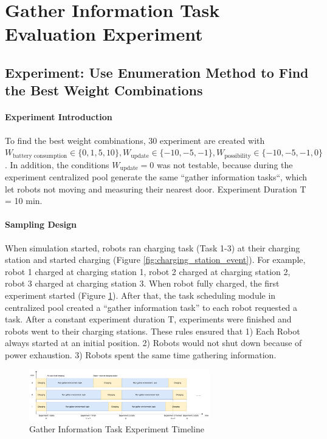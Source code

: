 \section{Gather Information Task Evaluation Experiment}
\label{sec:gather_info_task_experiments}

\subsection{Experiment: Use Enumeration Method to Find the Best Weight Combinations}
\label{sec:gather_info_experiment_enumerate}
\paragraph{Experiment Introduction} 
To find the best weight combinations, 30 experiment are created with $W_{\mbox{battery consumption}} \in \{ 0,1,5,10 \},  W_{\mbox{update}} \in \{-10,-5,-1\}, W_{\mbox{possibility}} \in \{-10,-5,-1,0\}$. In addition, the conditions $W_{\mbox{update}}=0$ was not testable, because during the experiment centralized pool generate the same ``gather information tasks``, which let robots not moving and measuring their nearest door. Experiment Duration T = 10 min.

\paragraph{Sampling Design} When simulation started, robots ran charging task (Task 1-3) at their charging station and started charging (Figure \ref{fig:charging_station_event}). For example, robot 1 charged at charging station 1, robot 2 charged at charging station 2, robot 3 charged at charging station 3. When robot fully charged, the first experiment started (Figure \ref{tab:env_exp_timeline}). After that, the task scheduling module in centralized pool created a ``gather information task'' to each robot requested a task. After a constant experiment duration T, experiments were finished and robots went to their charging stations. These rules ensured that 1) Each Robot always started at an initial position. 2) Robots would not shut down because of power exhaustion. 3) Robots spent the same time gathering information.

\begin{figure}[htbp]
    \centering
    \includegraphics[width = 0.7\textwidth]{content/images/ch5/env_exp_timeline.drawio.png}
    \caption{Gather Information Task Experiment Timeline}
    \label{tab:env_exp_timeline}
\end{figure}

